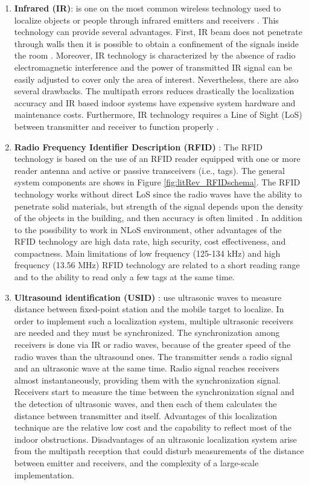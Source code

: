             \begin{enumerate}
				\item \textbf{Infrared (IR)}: is one on the most common wireless technology used to localize objects or people through infrared emitters and receivers \cite{mainetti2014Indoorlit}. This technology can provide several advantages. First, IR beam does not penetrate through walls then it is possible to obtain a confinement of the signals inside the room \cite{mainetti2014Indoorlit}. Moreover, IR technology is characterized by the absence of radio electromagnetic interference and the power of transmitted IR signal can be easily adjusted to cover only the area of interest. Nevertheless, there are also several drawbacks. The multipath errors reduces drastically the localization accuracy and IR based indoor systems have expensive system hardware and maintenance costs. Furthermore, IR technology requires a Line of Sight (LoS) between transmitter and receiver to function properly \cite{mainetti2014Indoorlit}.
                
                \item \textbf{Radio Frequency Identifier Description (RFID)} : The RFID technology is based on the use of an RFID reader equipped with one or more reader antenna and active or passive transceivers (i.e., tags). The general system components are shows in Figure \ref{fig:litRev_RFIDschema}. The RFID technology works without direct LoS since the radio waves have the ability to penetrate solid materials, but strength of the signal depends upon the density of the objects in the building, and then accuracy is often limited \cite{mainetti2014Indoorlit}. In addition to the possibility to work in NLoS environment, other advantages of the RFID technology are high data rate, high security, cost effectiveness, and compactness. Main limitations of low frequency (125-134 kHz) and high frequency (13.56 MHz) RFID technology are related to a short reading range and to the ability to read only a few tags at the same time.         
                \item \textbf{Ultrasound identification (USID) }: use ultrasonic waves to measure distance between fixed-point station and the mobile target to localize. In order to implement such a localization system, multiple ultrasonic receivers are needed and they must be synchronized. The synchronization among receivers is done via IR or radio waves, because of the greater speed of the radio waves than the ultrasound ones. The transmitter sends a radio signal and an ultrasonic wave at the same time. Radio signal reaches receivers almost instantaneously, providing them with the synchronization signal. Receivers start to measure the time between the synchronization signal and the detection of ultrasonic waves, and then each of them calculates the distance between transmitter and itself. Advantages of this localization technique are the relative low cost and the capability to reflect most of the indoor obstructions. Disadvantages of an ultrasonic localization system arise from the multipath reception that could disturb measurements of the distance between emitter and receivers, and the complexity of a large-scale implementation. 
                

\end{enumerate}
